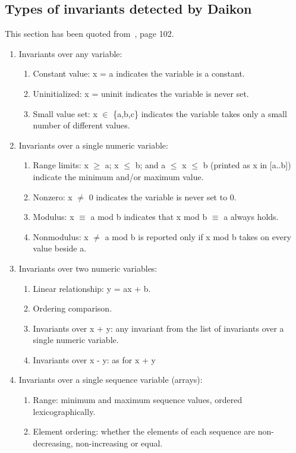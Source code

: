 \subsection{Types of invariants detected by Daikon}
This section has been quoted from~\cite{ernst2001dynamically}, page 102. 
\begin{enumerate}
\item Invariants over any variable: 
	\begin{enumerate}
	 \item Constant value: x = a indicates the variable is a constant.
	 \item Uninitialized: x = uninit indicates the variable is never set.
	 \item Small value set: x $\in$ \{a,b,c\} indicates the variable takes only a small number of different values.
	\end{enumerate}
\item Invariants over a single numeric variable: 
	\begin{enumerate}
	\item Range limits: x $\ge$ a; x $\le$ b; and a $\le$ x $\le$ b (printed as x in [a..b]) indicate the minimum and/or maximum value.
	\item Nonzero: x $\ne$ 0 indicates the variable is never set to 0. 
	\item Modulus: x $\equiv$ a mod b indicates that x mod b $\equiv$ a always holds.
	\item Nonmodulus: x $\ne$ a mod b is reported only if x mod b takes on every value beside a.
	\end{enumerate}
\item Invariants over two numeric variables: 
	\begin{enumerate}
	\item Linear relationship: y = ax + b. 
	\item Ordering comparison. 
	\item Invariants over x + y: any invariant from the list of invariants over a single numeric variable.
	\item Invariants over x - y: as for x + y
	\end{enumerate}
\item Invariants over a single sequence variable (arrays): 
	\begin{enumerate}
	\item Range: minimum and maximum sequence values, ordered lexicographically. 
	\item Element ordering: whether the elements of each sequence are non-decreasing, non-increasing or equal.

\end{enumerate}
\end{enumerate}
